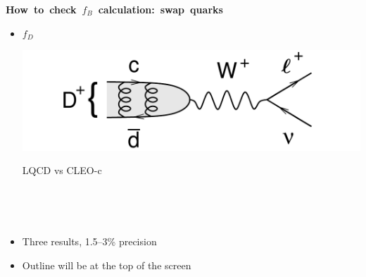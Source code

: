 \documentclass[landscape]{article}
\newenvironment{slide}[1][ ]{\mbox{\bf \boldmath #1 } \vfill}{\vfill \vspace{-1.5 cm} \mbox{ } \pagebreak}
\newenvironment{itemizer}[1]{\begin{itemize}\setlength{\itemsep}{#1}}{\end{itemize}}
\begin{document}
\begin{slide}[How to check $f_B$ calculation: swap quarks]
\begin{itemizer}{2 cm}
  \item \begin{minipage}{0.22\linewidth} $f_D$ \end{minipage} \hfill \begin{minipage}{11 cm} \includegraphics[width=\linewidth]{diagram_Dtolnu} \end{minipage} \hfill \begin{minipage}{0.3\linewidth} \begin{center} LQCD vs CLEO-c \end{center} \end{minipage}

\end{itemizer}

\vfill

\end{slide}

\begin{slide}

\vfill
\begin{center}
\end{center}

\vfill
\begin{itemizer}{1 cm}

  \item Three results, 1.5--3\% precision

  \item Outline will be at the top of the screen

\end{itemizer}

\vfill

\end{slide}
\end{document}
